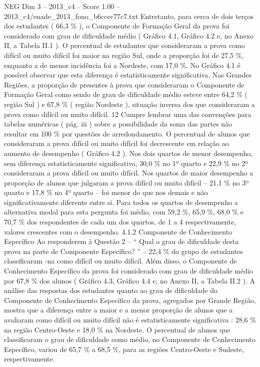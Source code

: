 \begin{textsample}{NEG Dim 3 – 2013\_c4 – Score 1.00 – 2013\_c4/enade\_2013\_fono\_b6ccec77c7.txt}
Entretanto, para cerca de dois terços dos estudantes ( 66,3 \% ), o Componente de Formação Geral da prova foi considerado com grau de dificuldade médio ( Gráfico 4.1, Gráfico 4.2 e, no Anexo II, a Tabela II.1 ).
O percentual de estudantes que consideraram a prova como difícil ou muito difícil foi maior na região Sul, onde a proporção foi de 27,5 \%, enquanto a de menor incidência foi a Nordeste, com 17,0 \%.
No Gráfico 4.1 é possível observar que esta diferença é estatisticamente significativa.
Nas Grandes Regiões, a proporção de presentes à prova que consideraram o Componente de Formação Geral como sendo de grau de dificuldade médio esteve entre 64,2 \% ( região Sul ) e 67,8 \% ( região Nordeste ), situação inversa dos que consideraram a prova como difícil ou muito difícil. 12 Cumpre lembrar uma das convenções para tabelas numéricas ( pág. iii ) sobre a possibilidade da soma das partes não resultar em 100 \% por questões de arredondamento.
O percentual de alunos que consideraram a prova difícil ou muito difícil foi decrescente em relação ao aumento de desempenho ( Gráfico 4.2 ).
Nos dois quartos de menor desempenho, sem diferença estatisticamente significativa, 30,0 \% no 1º quarto e 22,9 \% no 2º consideraram a prova difícil ou muito difícil.
Nos quartos de maior desempenho a proporção de alunos que julgaram a prova difícil ou muito difícil – 21,1 \% no 3º quarto e 17,8 \% no 4º quarto – foi menor do que nos demais e não significativamente diferente entre si.
Para todos os quartos de desempenho a alternativa modal para esta pergunta foi médio, com 59,2 \%, 65,9 \%, 68,0 \% e 70,7 \% dos respondentes de cada um dos quartos, de 1 a 4 respectivamente, valores crescentes com o desempenho. 4.1.2 Componente de Conhecimento Específico Ao responderem à Questão 2 – “ Qual o grau de dificuldade desta prova na parte de Componente Específico? ” – 22,4 \% do grupo de estudantes classificaram -na como difícil ou muito difícil.
Além disso, o Componente de Conhecimento Específico da prova foi considerado com grau de dificuldade médio por 67,8 \% dos alunos ( Gráfico 4.3, Gráfico 4.4 e, no Anexo II, a Tabela II.2 ).
A análise das respostas dos estudantes quanto ao grau de dificuldade do Componente de Conhecimento Específico da prova, agregados por Grande Região, mostra que a diferença entre a maior e a menor proporção de alunos que a avaliaram como difícil ou muito difícil não é estatisticamente significativa : 28,6 \% na região Centro-Oeste e 18,0 \% na Nordeste.
O percentual de alunos que classificaram o grau de dificuldade como médio, no Componente de Conhecimento Específico, variou de 65,7 \% a 68,5 \%, para as regiões Centro-Oeste e Sudeste, respectivamente.

\end{textsample}
